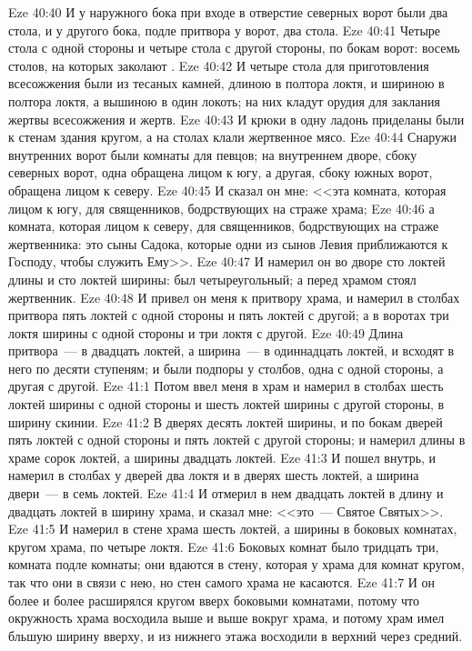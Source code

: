 \vs Eze 40:40 И у наружного бока при входе в отверстие северных ворот были два стола, и у другого бока, подле притвора у ворот, два стола.
\vs Eze 40:41 Четыре стола с одной стороны и четыре стола с другой стороны, по бокам ворот:  восемь столов, на которых заколают .
\vs Eze 40:42 И четыре стола для приготовления всесожжения были из тесаных камней, длиною в полтора локтя, и шириною в полтора локтя, а вышиною в один локоть; на них кладут орудия для заклания жертвы всесожжения и  жертв.
\vs Eze 40:43 И крюки в одну ладонь приделаны были к стенам здания кругом, а на столах клали жертвенное мясо.
\vs Eze 40:44 Снаружи внутренних ворот были комнаты для певцов; на внутреннем дворе, сбоку северных ворот, одна обращена лицом к югу, а другая, сбоку южных ворот, обращена лицом к северу.
\vs Eze 40:45 И сказал он мне: <<эта комната, которая лицом к югу, для священников, бодрствующих на страже храма;
\vs Eze 40:46 а комната, которая лицом к северу, для священников, бодрствующих на страже жертвенника: это сыны Садока, которые одни из сынов Левия приближаются к Господу, чтобы служить Ему>>.
\vs Eze 40:47 И намерил он во дворе сто локтей длины и сто локтей ширины:  был четыреугольный; а перед храмом стоял жертвенник.
\vs Eze 40:48 И привел он меня к притвору храма, и намерил в столбах притвора пять локтей с одной стороны и пять локтей с другой; а в воротах три локтя ширины с одной стороны и три локтя с другой.
\vs Eze 40:49 Длина притвора~--- в двадцать локтей, а ширина~--- в одиннадцать локтей, и всходят в него по десяти ступеням; и были подпоры у столбов, одна с одной стороны, а другая с другой.
\vs Eze 41:1 Потом ввел меня в храм и намерил в столбах шесть локтей ширины с одной стороны и шесть локтей ширины с другой стороны, в ширину скинии.
\vs Eze 41:2 В дверях десять локтей ширины, и по бокам дверей пять локтей с одной стороны и пять локтей с другой стороны; и намерил длины в храме сорок локтей, а ширины двадцать локтей.
\vs Eze 41:3 И пошел внутрь, и намерил в столбах у дверей два локтя и в дверях шесть локтей, а ширина двери~--- в семь локтей.
\vs Eze 41:4 И отмерил в нем двадцать локтей в длину и двадцать локтей в ширину храма, и сказал мне: <<это~--- Святое Святых>>.
\vs Eze 41:5 И намерил в стене храма шесть локтей, а ширины в боковых комнатах, кругом храма, по четыре локтя.
\vs Eze 41:6 Боковых комнат было тридцать три, комната подле комнаты; они вдаются в стену, которая у храма для комнат кругом, так что они в связи с нею, но стен самого храма не касаются.
\vs Eze 41:7 И он более и более расширялся кругом вверх боковыми комнатами, потому что окружность храма восходила выше и выше вокруг храма, и потому храм имел бльшую ширину вверху, и из нижнего этажа восходили в верхний через средний.
